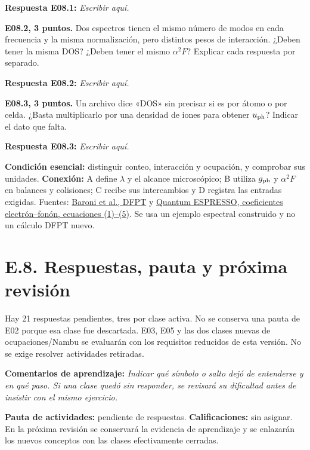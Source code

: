 \documentclass[
  spanish,
  10pt,
  a4paper,
]{article}
\begin{document}
\textbf{Respuesta E08.1:} \emph{Escribir aquí.}


\textbf{E08.2, 3 puntos.} Dos espectros tienen el mismo número de modos
en cada frecuencia y la misma normalización, pero distintos pesos de
interacción. ¿Deben tener la misma DOS? ¿Deben tener el mismo
\(\alpha^2F\)? Explicar cada respuesta por separado.

\textbf{Respuesta E08.2:} \emph{Escribir aquí.}


\textbf{E08.3, 3 puntos.} Un archivo dice «DOS» sin precisar si es por
átomo o por celda. ¿Basta multiplicarlo por una densidad de iones para
obtener \(u_{\rm ph}\)? Indicar el dato que falta.

\textbf{Respuesta E08.3:} \emph{Escribir aquí.}

\textbf{Condición esencial:} distinguir conteo, interacción y ocupación,
y comprobar sus unidades. \textbf{Conexión:} A define \(\lambda\) y el
alcance microscópico; B utiliza \(g_{\rm ph}\) y \(\alpha^2F\) en
balances y colisiones; C recibe sus intercambios y D registra las
entradas exigidas. Fuentes:
\href{https://arxiv.org/abs/cond-mat/0012092}{Baroni et al., DFPT} y
\href{https://www.quantum-espresso.org/Doc/ph_user_guide/node19.html}{Quantum
ESPRESSO, coeficientes electrón--fonón, ecuaciones (1)--(5)}. Se usa un
ejemplo espectral construido y no un cálculo DFPT nuevo.

\section{E.8. Respuestas, pauta y próxima
revisión}\label{e.8.-respuestas-pauta-y-pruxf3xima-revisiuxf3n}

Hay 21 respuestas pendientes, tres por clase activa. No se conserva una
pauta de E02 porque esa clase fue descartada. E03, E05 y las dos clases
nuevas de ocupaciones/Nambu se evaluarán con los requisitos reducidos de
esta versión. No se exige resolver actividades retiradas.

\textbf{Comentarios de aprendizaje:} \emph{Indicar qué símbolo o salto
dejó de entenderse y en qué paso. Si una clase quedó sin responder, se
revisará su dificultad antes de insistir con el mismo ejercicio.}

\textbf{Pauta de actividades:} pendiente de respuestas.
\textbf{Calificaciones:} sin asignar. En la próxima revisión se
conservará la evidencia de aprendizaje y se enlazarán los nuevos
conceptos con las clases efectivamente cerradas.
\end{document}
